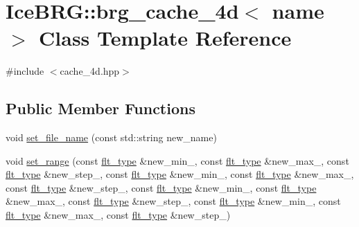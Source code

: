 \hypertarget{classIceBRG_1_1brg__cache__4d}{}\section{Ice\+B\+R\+G\+:\+:brg\+\_\+cache\+\_\+4d$<$ name $>$ Class Template Reference}
\label{classIceBRG_1_1brg__cache__4d}


{\ttfamily \#include $<$cache\+\_\+4d.\+hpp$>$}

\subsection*{Public Member Functions}
\begin{DoxyCompactItemize}
\item 
void \hyperlink{classIceBRG_1_1brg__cache__4d_aa897d7b7fbd62b61164b70c2cc459cba}{set\+\_\+file\+\_\+name} (const std\+::string new\+\_\+name)
\item 
void \hyperlink{classIceBRG_1_1brg__cache__4d_a6f06238133bbe2aa1dcd0b806f337665}{set\+\_\+range} (const \hyperlink{lib_2IceBRG__main_2common_8h_ad0f130a56eeb944d9ef2692ee881ecc4}{flt\+\_\+type} \&new\+\_\+min\+\_, const \hyperlink{lib_2IceBRG__main_2common_8h_ad0f130a56eeb944d9ef2692ee881ecc4}{flt\+\_\+type} \&new\+\_\+max\+\_, const \hyperlink{lib_2IceBRG__main_2common_8h_ad0f130a56eeb944d9ef2692ee881ecc4}{flt\+\_\+type} \&new\+\_\+step\+\_, const \hyperlink{lib_2IceBRG__main_2common_8h_ad0f130a56eeb944d9ef2692ee881ecc4}{flt\+\_\+type} \&new\+\_\+min\+\_, const \hyperlink{lib_2IceBRG__main_2common_8h_ad0f130a56eeb944d9ef2692ee881ecc4}{flt\+\_\+type} \&new\+\_\+max\+\_, const \hyperlink{lib_2IceBRG__main_2common_8h_ad0f130a56eeb944d9ef2692ee881ecc4}{flt\+\_\+type} \&new\+\_\+step\+\_, const \hyperlink{lib_2IceBRG__main_2common_8h_ad0f130a56eeb944d9ef2692ee881ecc4}{flt\+\_\+type} \&new\+\_\+min\+\_, const \hyperlink{lib_2IceBRG__main_2common_8h_ad0f130a56eeb944d9ef2692ee881ecc4}{flt\+\_\+type} \&new\+\_\+max\+\_, const \hyperlink{lib_2IceBRG__main_2common_8h_ad0f130a56eeb944d9ef2692ee881ecc4}{flt\+\_\+type} \&new\+\_\+step\+\_, const \hyperlink{lib_2IceBRG__main_2common_8h_ad0f130a56eeb944d9ef2692ee881ecc4}{flt\+\_\+type} \&new\+\_\+min\+\_, const \hyperlink{lib_2IceBRG__main_2common_8h_ad0f130a56eeb944d9ef2692ee881ecc4}{flt\+\_\+type} \&new\+\_\+max\+\_, const \hyperlink{lib_2IceBRG__main_2common_8h_ad0f130a56eeb944d9ef2692ee881ecc4}{flt\+\_\+type} \&new\+\_\+step\+\_)

\end{DoxyCompactItemize}
